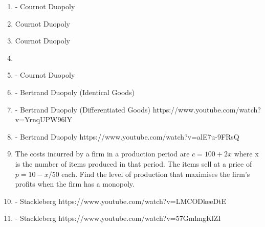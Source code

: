 \begin{enumerate}

\item- Cournot Duopoly

\item Cournot Duopoly

\item Cournot Duopoly


\item 


\item - Cournot Duopoly


\item - Bertrand Duopoly (Identical Goods)

\item - Bertrand Duopoly (Differentiated Goods)
https://www.youtube.com/watch?v=YrnqUPW96lY

\item - Bertrand Duopoly
     https://www.youtube.com/watch?v=alE7u-9FRsQ

\item 
The costs incurred by a firm in a production period are
$c = 100 + 2x$
where x is the number of items produced in that period. The items sell
at a price of
$p = 10 − x/50$
each. Find the level of production that maximises the firm’s profits
when the firm has a monopoly. 
\item - Stackleberg
https://www.youtube.com/watch?v=LMCODkeeDtE

\item - Stackleberg
https://www.youtube.com/watch?v=57GmlmgKlZI
\end{enumerate}




